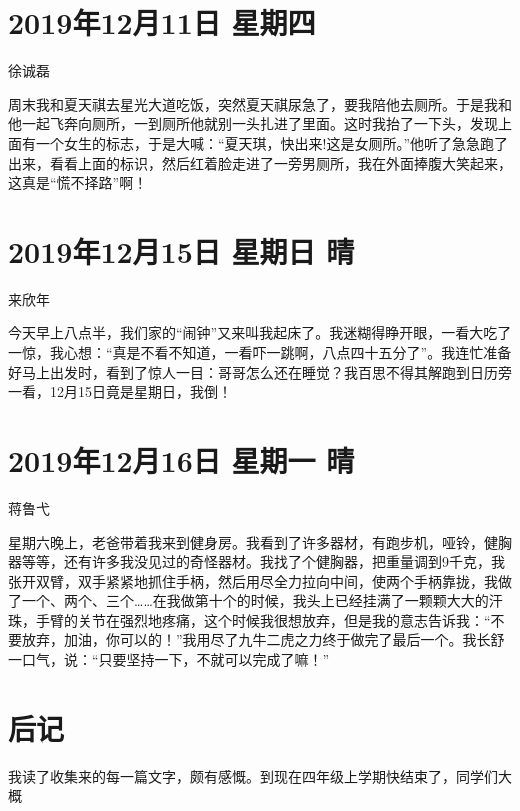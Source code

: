 \section{2019年12月11日 星期四}

徐诚磊

周末我和夏天祺去星光大道吃饭，突然夏天祺尿急了，要我陪他去厕所。于是我和他一起飞奔向厕所，一到厕所他就别一头扎进了里面。这时我抬了一下头，发现上面有一个女生的标志，于是大喊：``夏天琪，快出来!这是女厕所。''他听了急急跑了出来，看看上面的标识，然后红着脸走进了一旁男厕所，我在外面捧腹大笑起来，这真是``慌不择路''啊！

\section{2019年12月15日 星期日 晴}

来欣年

今天早上八点半，我们家的``闹钟''又来叫我起床了。我迷糊得睁开眼，一看大吃了一惊，我心想：``真是不看不知道，一看吓一跳啊，八点四十五分了''。我连忙准备好马上出发时，看到了惊人一目：哥哥怎么还在睡觉？我百思不得其解跑到日历旁一看，12月15日竟是星期日，我倒！

\section{2019年12月16日 星期一 晴}

蒋鲁弋

星期六晚上，老爸带着我来到健身房。我看到了许多器材，有跑步机，哑铃，健胸器等等，还有许多我没见过的奇怪器材。我找了个健胸器，把重量调到9千克，我张开双臂，双手紧紧地抓住手柄，然后用尽全力拉向中间，使两个手柄靠拢，我做了一个、两个、三个\ldots\ldots 在我做第十个的时候，我头上已经挂满了一颗颗大大的汗珠，手臂的关节在强烈地疼痛，这个时候我很想放弃，但是我的意志告诉我：``不要放弃，加油，你可以的！''我用尽了九牛二虎之力终于做完了最后一个。我长舒一口气，说：``只要坚持一下，不就可以完成了嘛！''

\section{后记}

我读了收集来的每一篇文字，颇有感慨。到现在四年级上学期快结束了，同学们大概
